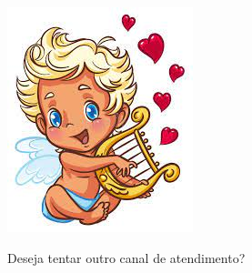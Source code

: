 {\begin{frame}
	
	
\end{frame}



\vfill
\pagebreak

\begin{center}
	\includegraphics[height=.7\textheight]{./IMG-GIT/anjo.jpg}
	
	
\end{center}

%


\vfill
\pagebreak


{\LARGE Deseja tentar outro canal de atendimento?}	

}
